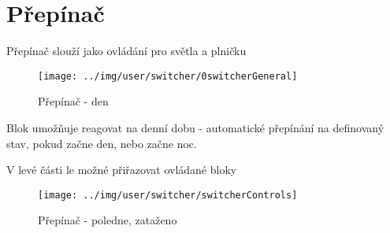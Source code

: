 
\section{Přepínač}

Přepínač slouží jako ovládání pro světla a plničku

\begin{figure}[!h]\centering
\texttt{[image: ../img/user/switcher/0switcherGeneral]}

\caption{Přepínač - den}
\label{fig:user_switcher_0switcherGeneral}

\end{figure}

\FloatBarrier

Blok umožňuje reagovat na denní dobu - automatické přepínání na definovaný stav, pokud začne den, nebo začne noc.

V levé části le možné přiřazovat ovládané bloky

\begin{figure}[!h]\centering
\texttt{[image: ../img/user/switcher/switcherControls]}

\caption{Přepínač - poledne, zataženo}
\label{fig:user_switcher_switcherControls}

\end{figure}


\FloatBarrier